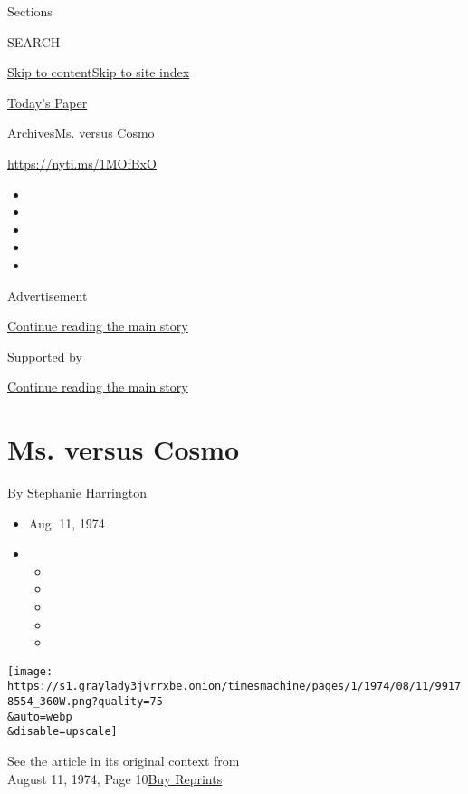 Sections

SEARCH

\protect\hyperlink{site-content}{Skip to
content}\protect\hyperlink{site-index}{Skip to site index}

\href{https://myaccount.nytimes3xbfgragh.onion/auth/login?response_type=cookie\&client_id=vi}{}

\href{https://www.nytimes3xbfgragh.onion/section/todayspaper}{Today's
Paper}

Archives\textbar{}Ms. versus Cosmo

\url{https://nyti.ms/1MOfBxO}

\begin{itemize}
\item
\item
\item
\item
\item
\end{itemize}

Advertisement

\protect\hyperlink{after-top}{Continue reading the main story}

Supported by

\protect\hyperlink{after-sponsor}{Continue reading the main story}

\hypertarget{ms-versus-cosmo}{%
\section{Ms. versus Cosmo}\label{ms-versus-cosmo}}

By Stephanie Harrington

\begin{itemize}
\item
  Aug. 11, 1974
\item
  \begin{itemize}
  \item
  \item
  \item
  \item
  \item
  \end{itemize}
\end{itemize}

\texttt{[image: https://s1.graylady3jvrrxbe.onion/timesmachine/pages/1/1974/08/11/99178554\_360W.png?quality=75\\\&auto=webp\\\&disable=upscale]}

See the article in its original context from\\
August 11, 1974, Page
10\href{https://store.nytimes3xbfgragh.onion/collections/new-york-times-page-reprints?utm_source=nytimes\&utm_medium=article-page\&utm_campaign=reprints}{Buy
Reprints}

